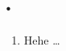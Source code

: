 \documentclass[11pt]{article}
\begin{document}
\raggedright

\section*{\lessonNumber. \lessonName}
\begin{enumerate}[itemsep=2em]
        \item
        Hehe \ldots

\end{enumerate}
\end{document}
